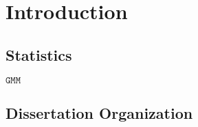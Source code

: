 \chapter{Introduction} \label{chap-intro}





    

\section{Statistics}
$\mathtt{GMM}$

\section{Dissertation Organization}
